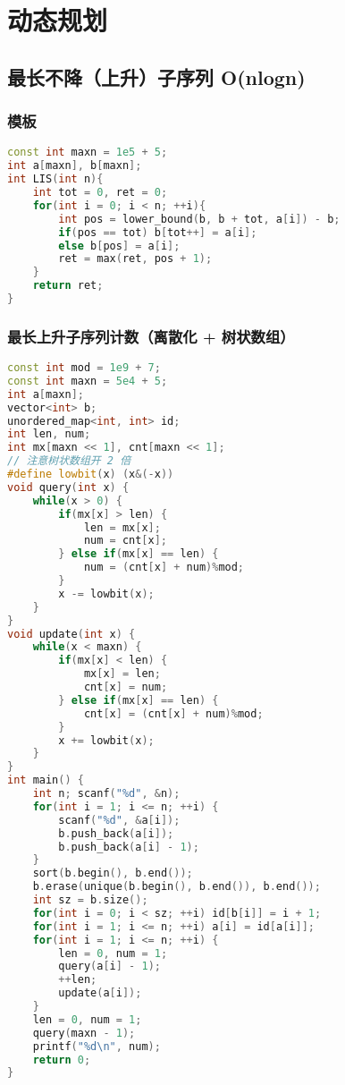 

\section{动态规划}

\subsection{最长不降（上升）子序列 O(nlogn)}

\subsubsection{模板}

\begin{lstlisting}[language=C++]
const int maxn = 1e5 + 5;
int a[maxn], b[maxn];
int LIS(int n){
    int tot = 0, ret = 0;
    for(int i = 0; i < n; ++i){
        int pos = lower_bound(b, b + tot, a[i]) - b;
        if(pos == tot) b[tot++] = a[i];
        else b[pos] = a[i];
        ret = max(ret, pos + 1);
    }
    return ret;
}
\end{lstlisting}

\subsubsection{最长上升子序列计数（离散化 + 树状数组）}


\begin{lstlisting}[language=C++]
const int mod = 1e9 + 7;
const int maxn = 5e4 + 5;
int a[maxn];
vector<int> b;
unordered_map<int, int> id;
int len, num;
int mx[maxn << 1], cnt[maxn << 1];
// 注意树状数组开 2 倍
#define lowbit(x) (x&(-x))
void query(int x) {
    while(x > 0) {
        if(mx[x] > len) {
            len = mx[x];
            num = cnt[x];
        } else if(mx[x] == len) {
            num = (cnt[x] + num)%mod;
        }
        x -= lowbit(x);
    }
}
void update(int x) {
    while(x < maxn) {
        if(mx[x] < len) {
            mx[x] = len;
            cnt[x] = num;
        } else if(mx[x] == len) {
            cnt[x] = (cnt[x] + num)%mod;
        }
        x += lowbit(x);
    }
}
int main() {
    int n; scanf("%d", &n);
    for(int i = 1; i <= n; ++i) {
        scanf("%d", &a[i]);
        b.push_back(a[i]);
        b.push_back(a[i] - 1);
    }
    sort(b.begin(), b.end());
    b.erase(unique(b.begin(), b.end()), b.end());
    int sz = b.size();
    for(int i = 0; i < sz; ++i) id[b[i]] = i + 1;
    for(int i = 1; i <= n; ++i) a[i] = id[a[i]];
    for(int i = 1; i <= n; ++i) {
        len = 0, num = 1;
        query(a[i] - 1);
        ++len;
        update(a[i]);
    }
    len = 0, num = 1;
    query(maxn - 1);
    printf("%d\n", num);
    return 0;
}
\end{lstlisting}

